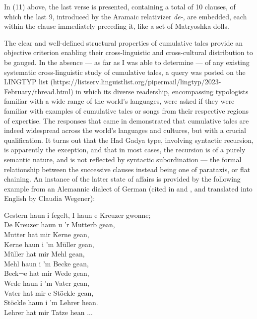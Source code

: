 \documentclass[output=paper,colorlinks,citecolor=brown
]{langscibook}
\begin{document}
\z

In (11) above, the last verse is presented, containing a total of 10 clauses, of which the last 9, introduced by the Aramaic relativizer \emph{de-}, are embedded, each within the clause immediately preceding it, like a set of Matryoshka dolls.  

The clear and well-defined structural properties of cumulative tales provide an objective criterion enabling their cross-linguistic and cross-cultural distribution to be gauged.  In the absence — as far as I was able to determine — of any existing systematic cross-linguistic study of cumulative tales, a query was posted on the LINGTYP list (https://listserv.linguistlist.org/pipermail/lingtyp/2023-February/thread.html) in which its diverse readership, encompassing typologists familiar with a wide range of the world's languages, were asked if they were familiar with examples of cumulative  tales or songs from their respective regions of expertise.  The responses that came in demonstrated that cumulative tales are indeed widespread across the world's languages and cultures, but with a crucial qualification.  It turns out that the Had Gadya type, involving syntactic recursion, is apparently the exception, and that in most cases, the recursion is of a purely semantic nature, and is not reflected by syntactic subordination — the formal relationship between the successive clauses instead being one of parataxis, or flat chaining.  An instance of the latter state of affairs is provided by the following example from an Alemannic dialect of German (cited in 
\cite[65]{meier1851deutsche} and \cite[39]{newell1905passover}, and translated into English by Claudia Wegener):

\ea

Gestern haun i fegelt, I haun e Kreuzer gwonne;\\
De Kreuzer haun u 'r Mutterb gean,\\
Mutter hat mir Kerne gean,\\
Kerne haun i 'm Müller gean,\\
Müller hat mir Mehl gean,\\
Mehl haun i 'm Becke gean,\\
Beck¬e hat mir Wede gean,\\
Wede haun i 'm Vater gean,\\
Vater hat mir e Stöckle gean,\\
Stöckle haun i 'm Lehrer hean.\\
Lehrer hat mir Tatze hean ...\\
 
\end{document}
